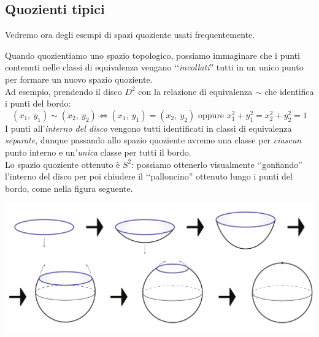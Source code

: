 	\subsection{Quozienti tipici}
Vedremo ora degli esempi di spazi quoziente usati frequentemente.
\begin{intuit}
	Quando quozientiamo uno spazio topologico, possiamo immaginare che i punti contenuti nelle classi di equivalenza vengano ‘‘\textit{incollati}'' tutti in un unico punto per formare un nuovo spazio quoziente.\\
	Ad esempio, prendendo il disco $D^2$ con la relazione di equivalenza $\sim$ che identifica i punti del bordo:
	\begin{equation*}
		(x_1,\ y_1) \sim (x_2,\ y_2)\iff (x_1,\ y_1)=(x_2,\ y_2) \text{ oppure } x_1^2 +y_1^2= x_2^2 +y_2^2=1
	\end{equation*}
	I punti all'\textit{interno del disco} vengono tutti identificati in classi di equivalenza \textit{separate}, dunque passando allo spazio quoziente avremo una classe per \textit{ciascun} punto interno e un'\textit{unica} classe per tutti il bordo.\\
	Lo spazio quoziente ottenuto è $S^2$: possiamo ottenerlo visualmente ‘‘gonfiando'' l'interno del disco per poi chiudere il ‘‘palloncino'' ottenuto lungo i punti del bordo, come nella figura seguente.
	\begin{center}
		\includegraphics[trim=0cm 0cm 0cm 0cm,clip,scale=0.4]{images/disctosphere.pdf}
	\end{center}
\vspace{-6mm}
\end{intuit}
